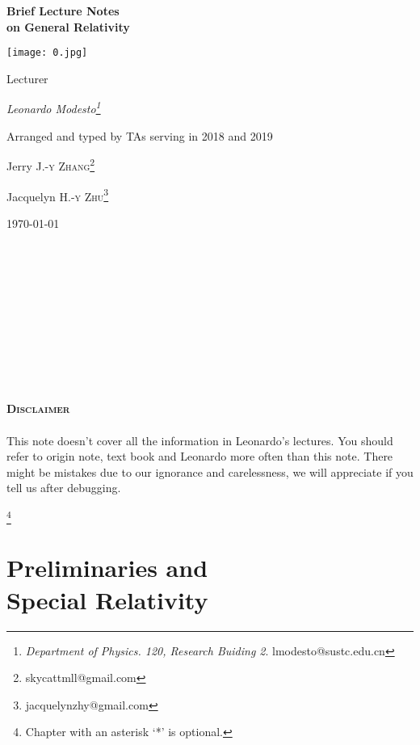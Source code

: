 \documentclass[openany,10pt]{book}
\theoremstyle{definition}
\theoremstyle{definition}
\theoremstyle{remark}
\begin{document}
\begin{titlepage}
	\vspace{1.5cm}
	{\Huge \bfseries Brief Lecture Notes \\on General Relativity \par}
	\vspace{1cm}
\texttt{[image: 0.jpg]}\par\vspace{2cm}
	Lecturer\par
    {\Large\itshape Leonardo Modesto\footnote{\textit{Department of Physics. 120, Research Buiding 2}. lmodesto@sustc.edu.cn}\par}
	\vfill
	Arranged and typed by TAs serving in 2018 and 2019\par
	Jerry J.-\textsc{y} \textsc{Zhang}\footnote{skycattmll@gmail.com}
\par
	Jacquelyn H.-\textsc{y} \textsc{Zhu}\footnote{jacquelynzhy@gmail.com}

	\vfill

	{\large \today\par}
\end{titlepage}

\newpage
{\centering
\
\\
\
\\
\
\\
\ \\ \ \\ \ \\ \ \\ \ \\ \ \\ \ \\
\Large{
\textsc{\bfseries Disclaimer}}\\
\
\\

\large{This note doesn't cover all the information in Leonardo's lectures. You should refer to origin note, text book and Leonardo more often than this note. There might be mistakes due to our ignorance and carelessness, we will appreciate if you tell us after debugging. }}

\clearpage
\tableofcontents\vfill\footnote{Chapter with an asterisk `*' is optional.}



\part[Preliminaries and Special Relativity]{Preliminaries and\\ Special Relativity}
\end{document}
